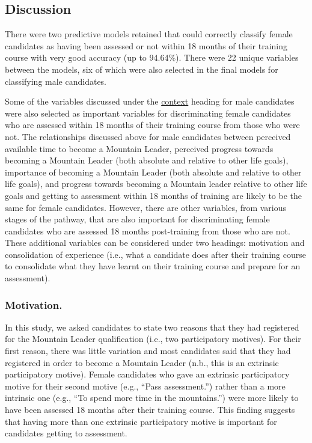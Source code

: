 \documentclass[
  12pt,
  a4paper,
]{book}
\begin{document}
\hypertarget{pra-demale-gta-discussion}{%
\subsection{Discussion}\label{pra-demale-gta-discussion}}

There were two predictive models retained that could correctly classify female candidates as having been assessed or not within 18 months of their training course with very good accuracy (up to 94.64\%). There were 22 unique variables between the models, six of which were also selected in the final models for classifying male candidates.

Some of the variables discussed under the \protect\hyperlink{context}{context} heading for male candidates were also selected as important variables for discriminating female candidates who are assessed within 18 months of their training course from those who were not. The relationships discussed above for male candidates between perceived available time to become a Mountain Leader, perceived progress towards becoming a Mountain Leader (both absolute and relative to other life goals), importance of becoming a Mountain Leader (both absolute and relative to other life goals), and progress towards becoming a Mountain leader relative to other life goals and getting to assessment within 18 months of training are likely to be the same for female candidates. However, there are other variables, from various stages of the pathway, that are also important for discriminating female candidates who are assessed 18 months post-training from those who are not. These additional variables can be considered under two headings: motivation and consolidation of experience (i.e., what a candidate does after their training course to consolidate what they have learnt on their training course and prepare for an assessment).

\hypertarget{pra-female-discussion-motivation}{%
\subsubsection{Motivation.}\label{pra-female-discussion-motivation}}

In this study, we asked candidates to state two reasons that they had registered for the Mountain Leader qualification (i.e., two participatory motives). For their first reason, there was little variation and most candidates said that they had registered in order to become a Mountain Leader (n.b., this is an extrinsic participatory motive). Female candidates who gave an extrinsic participatory motive for their second motive (e.g., ``Pass assessment.'') rather than a more intrinsic one (e.g., ``To spend more time in the mountains.'') were more likely to have been assessed 18 months after their training course. This finding suggests that having more than one extrinsic participatory motive is important for candidates getting to assessment.
\end{document}
